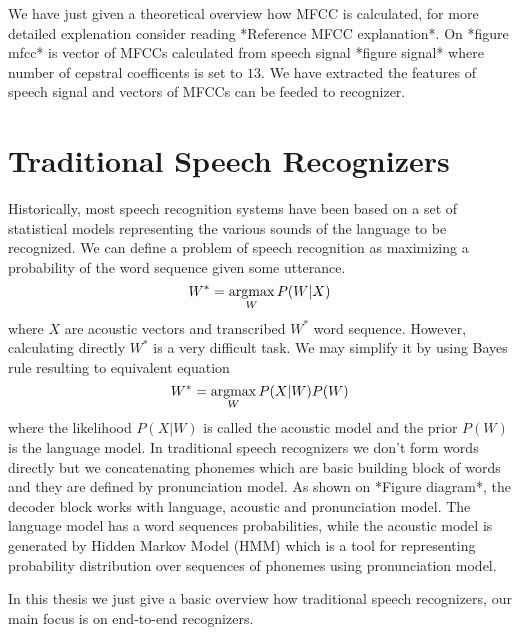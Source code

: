 We have just given a theoretical overview how MFCC is calculated, for more detailed explenation consider reading *Reference MFCC explanation*.
On *figure mfcc* is vector of MFCCs calculated from speech signal *figure signal* where number of cepstral coefficents is set to $13$.
We have extracted the features of speech signal and vectors of MFCCs can be feeded to recognizer.




\section{Traditional Speech Recognizers}


Historically, most speech recognition systems have been based on a set of statistical models representing the various sounds of the language to be recognized.
We can define a problem of speech recognition as maximizing a probability of the word sequence given some utterance.
\[ W^{*} = \operatorname*{argmax}_W P(W|X) \]
where $X$ are acoustic vectors and transcribed $W^{*}$ word sequence.
However, calculating directly $W^{*}$ is a very difficult task. We may simplify it by using Bayes rule resulting to equivalent equation
\[ W^{*} = \operatorname*{argmax}_W {P(X|W)P(W)} \]
where the likelihood $P(X|W)$ is called the acoustic model and the prior $P(W)$ is the language model.
In traditional speech recognizers we don't form words directly but we concatenating phonemes which are basic building block of words and they are defined by pronunciation model.
As shown on *Figure diagram*, the decoder block works with language, acoustic and pronunciation model.
The language model has a word sequences probabilities, while the acoustic model is generated by Hidden Markov Model (HMM) which is a tool for representing probability distribution over sequences of phonemes using pronunciation model.

In this thesis we just give a basic overview how traditional speech recognizers, our main focus is on end-to-end recognizers.


